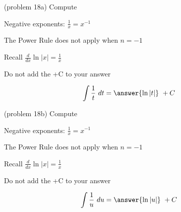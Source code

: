 \documentclass[handout]{ximera}
\begin{document}
\begin{problem}(problem 18a)
Compute 

\begin{hint}
Negative exponents: $\frac{1}{x} = x^{-1}$
\end{hint}
\begin{hint}
The Power Rule does not apply when $n = -1$
\end{hint}
\begin{hint}
Recall $\frac{d}{dx} \ln|x| = \frac{1}{x}$
\end{hint}
\begin{hint}
\begin{center}
Do not add the +C to your answer
\end{center}
\end{hint}

\[
\int \frac{1}{t} \ dt =
\answer{\ln|t|} \ + C
\]
\end{problem}

\begin{problem}(problem 18b)
Compute 

\begin{hint}
Negative exponents: $\frac{1}{x} = x^{-1}$
\end{hint}
\begin{hint}
The Power Rule does not apply when $n = -1$
\end{hint}
\begin{hint}
Recall $\frac{d}{dx} \ln|x| = \frac{1}{x}$
\end{hint}
\begin{hint}
\begin{center}
Do not add the +C to your answer
\end{center}
\end{hint}

\[
\int \frac{1}{u} \ du =
\answer{\ln|u|} \ + C
\]
\end{problem}
\end{document}

